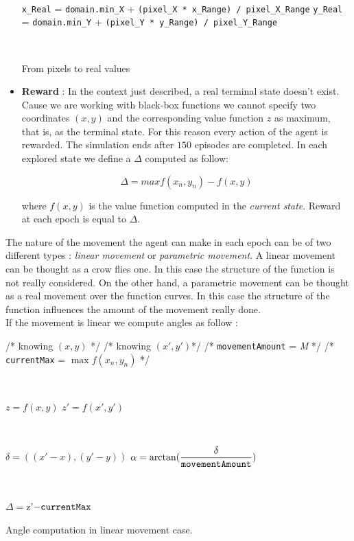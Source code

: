 \begin{itemize}
\begin{algorithm} [h!]
		\
		
		{\tt x\_Real} = {\tt domain.min\_X} + {\tt(pixel\_X * x\_Range) / pixel\_X\_Range} \;
		{\tt y\_Real} = {\tt domain.min\_Y} + {\tt (pixel\_Y * y\_Range) / pixel\_Y\_Range} \;
		
		\
		
		\label{algoPixel}
		\caption{From pixels to real values} 
	\end{algorithm}
	
	\item \textbf{Reward} : In the context just described, a real terminal state doesn't exist. Cause we are working with black-box functions we cannot specify two coordinates $(x, y)$ and the corresponding value function $z$ as maximum, that is, as the terminal state. For this reason every action of the agent is rewarded. The simulation ends after $150$ episodes are completed.
	In each explored state we define a $\Delta$ computed as follow: 
	
	\begin{equation}
		\Delta = max f(x_n, y_n) - f(x, y)
	\end{equation} 
	
	where $f(x, y)$ is the value function computed in the  \textit{current state}. Reward at each epoch is equal to $\Delta$.
	
\end{itemize}

The nature of the movement the agent can make in each epoch can be of two different types : \textit{linear movement} or \textit{parametric movement}. A linear movement can be thought as a crow flies one. In this case the structure of the function is not really considered. On the other hand, a parametric movement can be thought as a real movement over the function curves. In this case the structure of the function influences the amount of the movement really done. \\

If the movement is linear we compute angles as follow :

\begin{algorithm}
	/* knowing $(x, y)$ */ \;
	/* knowing $(x', y')$*/ \;
	/* {\tt movementAmount} = \textit{M} */ \;
	/* {\tt currentMax} = $\max f(x_n, y_n)$ */ \;
	
	
	\
	
	$z = f(x, y)$ \;
	$z' = f(x', y')$\;
	
	\
	
	$\delta = ((x'-x),  (y'-y))$ \;
	$\alpha = \arctan(\dfrac{\delta}{\tt movementAmount})$
	 
	 \
	 
	 $\Delta = $z'$ - {\tt currentMax} $
	 
	 \caption{Angle computation in linear movement case.} 
	
\end{algorithm}


